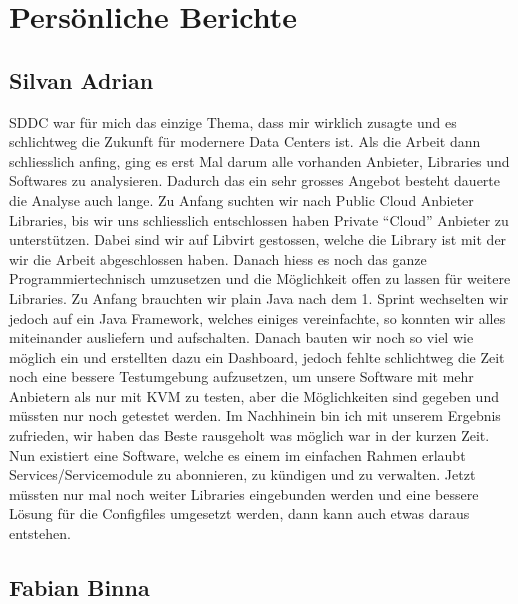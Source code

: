 \chapter{Persönliche Berichte}

\section{Silvan Adrian}

SDDC war für mich das einzige Thema, dass mir wirklich zusagte und es 
schlichtweg die Zukunft für modernere Data Centers ist.
Als die Arbeit dann schliesslich anfing, ging es erst Mal darum alle vorhanden 
Anbieter, Libraries und Softwares zu analysieren. Dadurch das ein sehr 
grosses Angebot besteht dauerte die Analyse auch lange.
Zu Anfang suchten wir nach Public Cloud Anbieter Libraries, bis 
wir uns schliesslich entschlossen haben Private ``Cloud'' Anbieter zu 
unterstützen. Dabei sind wir auf Libvirt gestossen, welche die 
Library ist mit der wir die Arbeit abgeschlossen haben.
Danach hiess es noch das ganze Programmiertechnisch umzusetzen und die 
Möglichkeit offen zu lassen für weitere Libraries.
Zu Anfang brauchten wir plain Java nach dem 1. Sprint wechselten wir jedoch auf ein 
Java Framework, welches einiges 
vereinfachte, so konnten wir alles miteinander ausliefern und aufschalten.
Danach bauten wir noch so viel wie möglich ein und erstellten dazu ein Dashboard,
 jedoch fehlte schlichtweg die 
Zeit noch eine bessere Testumgebung aufzusetzen, um unsere Software mit mehr 
Anbietern als nur mit KVM zu testen, aber die Möglichkeiten sind gegeben und 
müssten nur noch getestet werden.
\newline
Im Nachhinein bin ich mit unserem Ergebnis zufrieden, wir haben das Beste 
rausgeholt was möglich war in der kurzen Zeit.
Nun existiert eine Software, welche es einem im einfachen Rahmen erlaubt 
Services/Servicemodule zu abonnieren, zu kündigen und zu verwalten.
Jetzt müssten nur mal noch weiter Libraries eingebunden werden und eine bessere 
Lösung für die Configfiles umgesetzt werden, dann kann auch etwas daraus entstehen.


\section{Fabian Binna}

